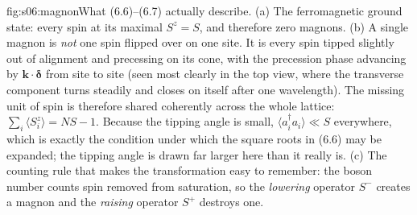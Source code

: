 %
\begin{aqmfigure}{fig:s06:magnon}{What (6.6)--(6.7) actually describe. (a) The ferromagnetic ground
state: every spin at its maximal $S^z=S$, and therefore zero magnons. (b) A single magnon is
\emph{not} one spin flipped over on one site. It is every spin tipped slightly out of alignment and
precessing on its cone, with the precession phase advancing by $\mathbf k\cdot\boldsymbol\delta$
from site to site (seen most clearly in the top view, where the transverse component turns steadily
and closes on itself after one wavelength). The missing unit of spin is therefore shared coherently
across the whole lattice: $\sum_i\langle S_i^z\rangle=NS-1$. Because the tipping angle is small,
$\langle a_i^\dagger a_i\rangle\ll S$ everywhere, which is exactly the condition under which the
square roots in (6.6) may be expanded; the tipping angle is drawn far larger here than it
really is. (c) The counting rule that makes the transformation easy to
remember: the boson number counts spin removed from saturation, so the \emph{lowering} operator
$S^-$ creates a magnon and the \emph{raising} operator $S^+$ destroys one.}

\end{aqmfigure}
